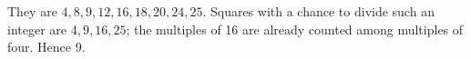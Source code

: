 They are $4,8,9,12,16,18,20,24,25$. Squares with a chance to divide such an integer are $4,9,16,25$; the multiples of 16 are already counted among multiples of four. Hence $\boxed9$.
